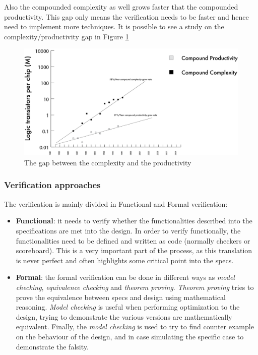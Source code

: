Also the compounded complexity as well grows faster that the compounded productivity. This gap only means the verification needs to be faster and hence need to implement more techniques.
It is possible to see a study on the complexity/productivity gap in Figure \ref{complexity-gap}
\begin{figure}[H]
    \centering
    \includegraphics[scale = 0.4]{Chapter_1/img/prod-compl.png}
    \caption{The gap between the complexity and the productivity \cite{verification-book-2018}}
    \label{complexity-gap}
\end{figure}

\subsubsection{Verification approaches}
The verification is mainly divided in Functional and Formal verification:
\begin{itemize}
    \item \textbf{Functional}: it needs to verify whether the functionalities described into the specifications are met into the design. In order to verify functionally, the functionalities need to be defined and written as code (normally checkers or scoreboard). This is a very important part of the process, as this translation is never perfect and often highlights some critical point into the specs.
    
    \item \textbf{Formal}: the formal verification can be done in different ways as \textit{model checking}, \textit{equivalence checking} and \textit{theorem proving}. \textit{Theorem proving} tries to prove the equivalence between specs and design using mathematical reasoning. \textit{Model checking} is useful when performing optimization to the design, trying to demonstrate the various versions are mathematically equivalent. Finally, the \textit{model checking} is used to try to find counter example on the behaviour of the design, and in case simulating the specific case to demonstrate the falsity.
\end{itemize}

